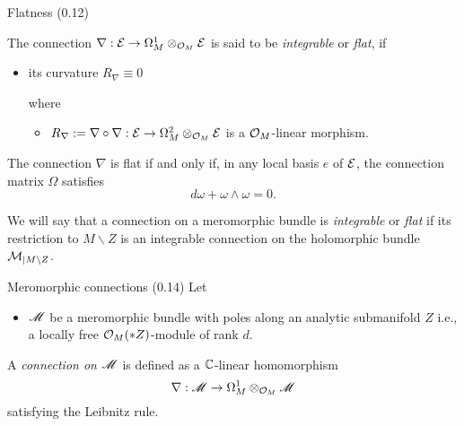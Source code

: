 \begin{frame}[t]{Flatness (0.12)}
  \begin{defn}[0.12.2]
    The connection $\nabla:\mathcal{E}\to \Omega_M^1\otimes_{\mathcal{O}_M}\mathcal{E}$ is said to be
    \emph{integrable} or \emph{flat}, if
    \begin{itemize}
      \item its curvature $R_\nabla\equiv0$

      where
      \begin{itemize}
        \item $R_\nabla:=\nabla\circ\nabla:\mathcal{E}\to\Omega_M^2\otimes_{\mathcal{O}_M}\mathcal{E}$
          is a $\mathcal{O}_M$-linear morphism.
      \end{itemize}
    \end{itemize}
  \end{defn}
  \begin{prop}[0.12.4]
    The connection $\nabla$ is flat if and only if, in any local basis $e$ of
    $\mathcal{E}$, the connection matrix $\Omega$ satisfies
    \[
      d\omega + \omega \wedge \omega = 0.
    \]
  \end{prop}
  We will say that a connection on a meromorphic bundle is \emph{integrable}
  or \emph{flat} if its restriction to $M\backslash Z$ is an integrable connection on
  the holomorphic bundle $\mathcal{M}_{|M\backslash Z}$.
\end{frame}

\begin{frame}[t]{Meromorphic connections (0.14)}
  Let
  \begin{itemize}
    \item $\mathscr{M}$ be a meromorphic bundle with poles along an analytic
      submanifold $Z$ i.e., a locally free $\mathcal{O}_M(*Z)$-module of rank $d$.
  \end{itemize}
  \begin{defn}
    A \emph{connection on $\mathscr{M}$} is defined as a $\mathbb{C}$-linear homomorphism
    \[
      \nabla:\mathscr{M}\to\Omega_M^1\otimes_{\mathcal{O}_M}\mathscr{M}
    \]
    satisfying the Leibnitz rule.
  \end{defn}
\end{frame}

